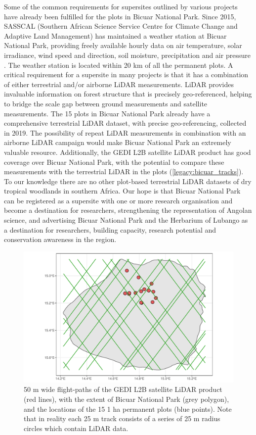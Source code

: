 \begin{refsection}
Some of the common requirements for supersites outlined by various projects have already been fulfilled for the plots in Bicuar National Park. Since 2015, SASSCAL (Southern African Science Service Centre for Climate Change and Adaptive Land Management) has maintained a weather station at Bicuar National Park, providing freely available hourly data on air temperature, solar irradiance, wind speed and direction, soil moisture, precipitation and air pressure \citep{SASSCAL_weather}. The weather station is located within 20 km of all the permanent plots. A critical requirement for a supersite in many projects is that it has a combination of either terrestrial and/or airborne LiDAR measurements. LiDAR provides invaluable information on forest structure that is precisely geo-referenced, helping to bridge the scale gap between ground measurements and satellite measurements. The 15 plots in Bicuar National Park already have a comprehensive terrestrial LiDAR dataset, with precise geo-referencing, collected in 2019. The possibility of repeat LiDAR measurements in combination with an airborne LiDAR campaign would make Bicuar National Park an extremely valuable resource. Additionally, the GEDI L2B satellite LiDAR product has good coverage over Bicuar National Park, with the potential to compare these measurements with the terrestrial LiDAR in the plots (\autoref{legacy:bicuar_tracks}). To our knowledge there are no other plot-based terrestrial LiDAR datasets of dry tropical woodlands in southern Africa. Our hope is that Bicuar National Park can be registered as a supersite with one or more research organisation and become a destination for researchers, strengthening the representation of Angolan science, and advertising Bicuar National Park and the Herbarium of Lubango as a destination for researchers, building capacity, research potential and conservation awareness in the region.

\begin{figure}[!h]
\centering
	\includegraphics[width=\textwidth]{img/bicuar_tracks}
	\caption[GEDI satellite LiDAR tracks over Bicuar National Park]{50 m wide flight-paths of the GEDI L2B satellite LiDAR product (red lines), with the extent of Bicuar National Park (grey polygon), and the locations of the 15 1 ha permanent plots (blue points). Note that in reality each 25 m track consists of a series of 25 m radius circles which contain LiDAR data.}
	\label{legacy:bicuar_tracks}
\end{figure}


\end{refsection}
